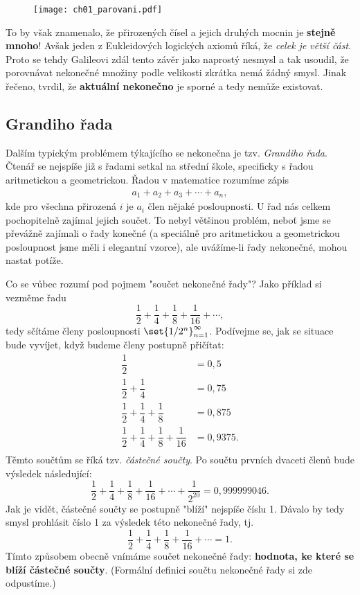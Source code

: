 \begin{figure}[H]
	\centering
	\texttt{[image: ch01\_parovani.pdf]}
\end{figure}

To by však znamenalo, že přirozených čísel a jejich druhých mocnin je \textbf{stejně mnoho}! Avšak jeden z Eukleidových logických axiomů říká, že \emph{celek je větší část}. Proto se tehdy Galileovi zdál tento závěr jako naprostý nesmysl a tak usoudil, že porovnávat nekonečné množiny podle velikosti zkrátka nemá žádný smysl. Jinak řečeno, tvrdil, že \textbf{aktuální nekonečno} je sporné a tedy nemůže existovat. \cite{Fuchs2003}%

\subsection{Grandiho řada}

Dalším typickým problémem týkajícího se nekonečna je tzv. \emph{Grandiho řada}. Čtenář se nejspíše již s řadami setkal na střední škole, specificky s řadou aritmetickou a geometrickou. Řadou v matematice rozumíme zápis
\begin{align*}
a_1+a_2+a_3+\cdots+a_n,
\end{align*}
kde pro všechna přirozená $i$ je $a_i$ člen nějaké posloupnosti. U řad nás celkem pochopitelně zajímal jejich součet. To nebyl většinou problém, neboť jsme se převážně zajímali o řady konečné (a speciálně pro aritmetickou a geometrickou posloupnost jsme měli i elegantní vzorce), ale uvážíme-li řady nekonečné, mohou nastat potíže.\par
Co se vůbec rozumí pod pojmem "součet nekonečné řady"? Jako příklad si vezměme řadu
\begin{equation*}
	\dfrac{1}{2}+\dfrac{1}{4}+\dfrac{1}{8}+\dfrac{1}{16}+\cdots,
\end{equation*}
tedy sčítáme členy posloupnosti $\set{1/2^n}_{n=1}^{\infty}$. Podívejme se, jak se situace bude vyvíjet, když budeme členy postupně přičítat:
\begin{align*}
	\dfrac{1}{2}&=0{,}5\\
	\dfrac{1}{2}+\dfrac{1}{4}&=0{,}75\\
	\dfrac{1}{2}+\dfrac{1}{4}+\dfrac{1}{8}&=0{,}875\\
	\dfrac{1}{2}+\dfrac{1}{4}+\dfrac{1}{8}+\dfrac{1}{16}&=0{,}9375.\\
\end{align*}
Těmto součtům se říká tzv. \emph{částečné součty}. Po součtu prvních dvaceti členů bude výsledek následující:
\begin{equation*}
	\dfrac{1}{2}+\dfrac{1}{4}+\dfrac{1}{8}+\dfrac{1}{16}+\cdots+\dfrac{1}{2^{20}}=0{,}999999046.
\end{equation*}
Jak je vidět, částečné součty se postupně "blíží" nejspíše číslu 1. Dávalo by tedy smysl prohlásit číslo 1 za výsledek této nekonečné řady, tj.
\begin{equation*}
	\dfrac{1}{2}+\dfrac{1}{4}+\dfrac{1}{8}+\dfrac{1}{16}+\cdots=1.
\end{equation*}
Tímto způsobem obecně vnímáme součet nekonečné řady: \textbf{hodnota, ke které se blíží částečné součty}. (Formální definici součtu nekonečné řady si zde odpustíme.)
\medskip

